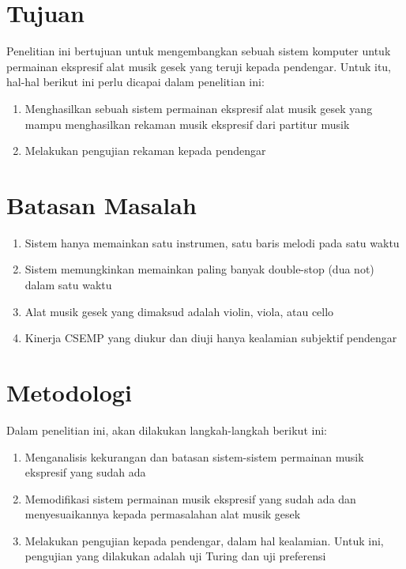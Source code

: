 \section{Tujuan}

Penelitian ini bertujuan untuk mengembangkan sebuah sistem komputer untuk permainan ekspresif alat musik gesek yang teruji kepada pendengar. Untuk itu, hal-hal berikut ini perlu dicapai dalam penelitian ini:
\begin{enumerate}
	\item Menghasilkan sebuah sistem permainan ekspresif alat musik gesek yang mampu menghasilkan rekaman musik ekspresif dari partitur musik
	\item Melakukan pengujian rekaman kepada pendengar
\end{enumerate}

\section{Batasan Masalah}

\begin{enumerate}
	\item Sistem hanya memainkan satu instrumen, satu baris melodi pada satu waktu
	\item Sistem memungkinkan memainkan paling banyak double-stop (dua not) dalam satu waktu
	\item Alat musik gesek yang dimaksud adalah violin, viola, atau cello
	\item Kinerja CSEMP yang diukur dan diuji hanya kealamian subjektif pendengar
\end{enumerate}

\section{Metodologi}

Dalam penelitian ini, akan dilakukan langkah-langkah berikut ini:
\begin{enumerate}
	\item Menganalisis kekurangan dan batasan sistem-sistem permainan musik ekspresif yang sudah ada
	\item Memodifikasi sistem permainan musik ekspresif yang sudah ada dan menyesuaikannya kepada permasalahan alat musik gesek
	\item Melakukan pengujian kepada pendengar, dalam hal kealamian. Untuk ini, pengujian yang dilakukan adalah uji Turing dan uji preferensi
\end{enumerate}